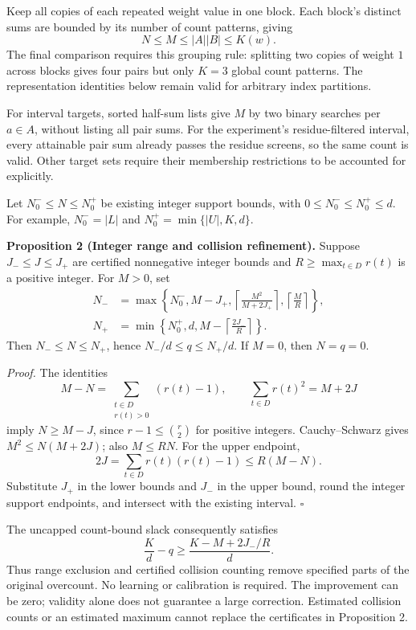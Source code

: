 \documentclass[10pt,english]{article}
\begin{document}
Keep all copies of each repeated weight value in one block. Each block's
distinct sums are bounded by its number of count patterns, giving
\[
N\le M\le |A||B|\le K(w).
\]
The final comparison requires this grouping rule: splitting two copies of
weight \(1\) across blocks gives four pairs but only \(K=3\) global
count patterns. The representation identities below remain valid for
arbitrary index partitions.

For interval targets, sorted half-sum lists give \(M\) by two binary
searches per \(a\in A\), without listing all pair sums. For the
experiment's residue-filtered interval, every attainable pair sum already
passes the residue screens, so the same count is valid. Other target sets
require their membership restrictions to be accounted for explicitly.

Let \(N_0^-\le N\le N_0^+\) be existing integer support bounds, with
\(0\le N_0^-\le N_0^+\le d\). For example,
\(N_0^-=|L|\) and \(N_0^+=\min\{|U|,K,d\}\).

\begin{tcolorbox}[accentbox,breakable=false]
\textbf{Proposition 2 (Integer range and collision refinement).}
Suppose \(J_-\le J\le J_+\) are certified nonnegative integer bounds and
\(R\ge\max_{t\in D}r(t)\) is a positive integer. For \(M>0\), set
\[
\begin{aligned}
N_-&=\max\left\{N_0^-,M-J_+,
 \left\lceil\frac{M^2}{M+2J_+}\right\rceil,
 \left\lceil\frac M R\right\rceil\right\},\\
N_+&=\min\left\{N_0^+,d,M-\left\lceil\frac{2J_-}{R}\right\rceil\right\}.
\end{aligned}
\]
Then \(N_-\le N\le N_+\), hence \(N_-/d\le q\le N_+/d\).
If \(M=0\), then \(N=q=0\).
\end{tcolorbox}

\textit{Proof.} The identities
\[
M-N=\sum_{\substack{t\in D\\r(t)>0}}(r(t)-1),\qquad
\sum_{t\in D}r(t)^2=M+2J
\]
imply \(N\ge M-J\), since \(r-1\le\binom r2\) for positive integers.
Cauchy--Schwarz gives \(M^2\le N(M+2J)\); also \(M\le RN\).
For the upper endpoint,
\[
2J=\sum_{t\in D}r(t)(r(t)-1)\le R(M-N).
\]
Substitute \(J_+\) in the lower bounds and \(J_-\) in the upper bound,
round the integer support endpoints, and intersect with the existing
interval. \hfill\(\square\)

The uncapped count-bound slack consequently satisfies
\[
\frac Kd-q\ge\frac{K-M+2J_-/R}{d}.
\]
Thus range exclusion and certified collision counting remove specified
parts of the original overcount. No learning or calibration is required.
The improvement can be zero; validity alone does not guarantee a large
correction. Estimated collision counts or an estimated maximum cannot
replace the certificates in Proposition 2.
\end{document}

